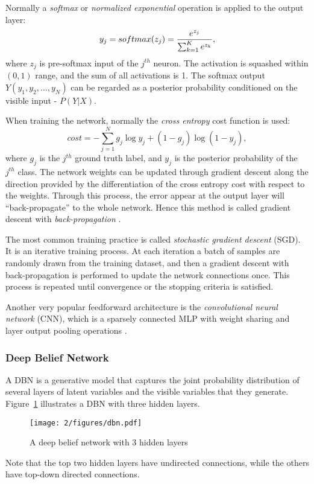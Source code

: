Normally a {\it softmax} or {\it normalized exponential} operation is applied to the output layer:
\begin{equation}
y_j = softmax(z_j)={e^{z_j} \over \sum_{k=1}^K e^{z_k}},
\end{equation}
where $z_j$ is pre-softmax input of the $j^{th}$ neuron. The activation is squashed within $(0,1)$ range, and the sum of all activations is 1. The softmax output $Y(y_1,y_2,...,y_N)$ can be regarded as a posterior probability conditioned on the visible input - $P(Y|X)$.

When training the network, normally the {\it cross entropy} cost function \cite{murphy2012machine} is used:
\begin{equation}\label{eq:2-crossentropy}
cost = -\sum_{j=1}^N g_j\log y_j + (1-g_j)\log(1-y_j),
\end{equation}
where $g_j$ is the $j^{th}$ ground truth label, and $y_j$ is the posterior probability of the $j^{th}$ class. The network weights can be updated through gradient descent along the direction provided by the differentiation of the cross entropy cost with respect to the weights. Through this process, the error appear at the output layer will ``back-propagate'' to the whole network. Hence this method is called gradient descent with {\it back-propagation} \cite{rumelhart1988learning}.

The most common training practice is called {\it stochastic gradient descent} (SGD). It is an iterative training process. At each iteration a batch of samples are randomly drawn from the training dataset, and then a gradient descent with back-propagation is performed to update the network connections once. This process is repeated until convergence or the stopping criteria is satisfied.

Another very popular feedforward architecture is the {\it convolutional neural network} (CNN), which is a sparsely connected MLP with weight sharing and layer output pooling operations \cite{lecun1995convolutional}.

\subsubsection{Deep Belief Network}
A DBN is a generative model that captures the joint probability distribution of several layers of latent variables and the visible variables that they generate. Figure~\ref{fig:2-dbn} illustrates a DBN with three hidden layers.
\begin{figure}[htb]
\centering
\texttt{[image: 2/figures/dbn.pdf]}
\caption{A deep belief network with 3 hidden layers}
\label{fig:2-dbn}
\end{figure}
Note that the top two hidden layers have undirected connections, while the others have top-down directed connections.

